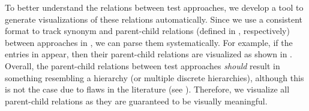 To better understand the relations between test approaches, we develop a tool
to generate visualizations of these relations automatically.
\ifnotpaper
    Since we use a consistent format to track synonym and parent-child
    relations (defined in , respectively)
    between approaches in \ourApproachGlossary{}, we can parse them
    systematically. For example, if the entries in 
    appear, then their parent-child relations are visualized as
    shown in . Overall, the parent-child relations
    between test approaches \emph{should} result in something resembling a
    hierarchy (or multiple discrete hierarchies), although this is not the case
    due to flaws in the literature (see ). Therefore, we
    visualize all parent-child relations as they are guaranteed to be
    visually meaningful.

    
    \ExampleParChdGraphs{}


